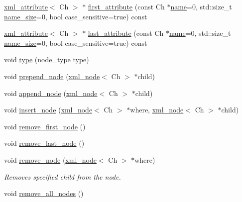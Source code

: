\begin{DoxyCompactItemize}
\item 
\hyperlink{classrapidxml_1_1xml__attribute}{xml\-\_\-attribute}$<$ Ch $>$ $\ast$ \hyperlink{classrapidxml_1_1xml__node_ae426802be58114ffc41bf30ac6b8c37d}{first\-\_\-attribute} (const Ch $\ast$\hyperlink{classrapidxml_1_1xml__base_a9a09739310469995db078ebd0da3ed45}{name}=0, std\-::size\-\_\-t \hyperlink{classrapidxml_1_1xml__base_a7e7f98b3d01e1eab8dc1ca69aad9af84}{name\-\_\-size}=0, bool case\-\_\-sensitive=true) const 
\item 
\hyperlink{classrapidxml_1_1xml__attribute}{xml\-\_\-attribute}$<$ Ch $>$ $\ast$ \hyperlink{classrapidxml_1_1xml__node_a50c03f2db3fa51f27a73d86ec29a49d3}{last\-\_\-attribute} (const Ch $\ast$\hyperlink{classrapidxml_1_1xml__base_a9a09739310469995db078ebd0da3ed45}{name}=0, std\-::size\-\_\-t \hyperlink{classrapidxml_1_1xml__base_a7e7f98b3d01e1eab8dc1ca69aad9af84}{name\-\_\-size}=0, bool case\-\_\-sensitive=true) const 
\item 
void \hyperlink{classrapidxml_1_1xml__node_a499bbc9300c1b06821d5c08b24164c68}{type} (node\-\_\-type type)
\item 
void \hyperlink{classrapidxml_1_1xml__node_ae86e92908c3eab40bbed8216e4f3f3cb}{prepend\-\_\-node} (\hyperlink{classrapidxml_1_1xml__node}{xml\-\_\-node}$<$ Ch $>$ $\ast$child)
\item 
void \hyperlink{classrapidxml_1_1xml__node_a8696d098ecc9c4d2a646b43e91d58e31}{append\-\_\-node} (\hyperlink{classrapidxml_1_1xml__node}{xml\-\_\-node}$<$ Ch $>$ $\ast$child)
\item 
void \hyperlink{classrapidxml_1_1xml__node_a666880f42a7e486d78cc45ed51c7c46d}{insert\-\_\-node} (\hyperlink{classrapidxml_1_1xml__node}{xml\-\_\-node}$<$ Ch $>$ $\ast$where, \hyperlink{classrapidxml_1_1xml__node}{xml\-\_\-node}$<$ Ch $>$ $\ast$child)
\item 
void \hyperlink{classrapidxml_1_1xml__node_a62bf7b276cf7a651a3337f5e0a0ef6ac}{remove\-\_\-first\-\_\-node} ()
\item 
void \hyperlink{classrapidxml_1_1xml__node_a9182512e948ec451a83f116cce7c7674}{remove\-\_\-last\-\_\-node} ()
\item 
\hypertarget{classrapidxml_1_1xml__node_a98289923eb9e8889418a9eb0207ea35c}{void \hyperlink{classrapidxml_1_1xml__node_a98289923eb9e8889418a9eb0207ea35c}{remove\-\_\-node} (\hyperlink{classrapidxml_1_1xml__node}{xml\-\_\-node}$<$ Ch $>$ $\ast$where)}\label{classrapidxml_1_1xml__node_a98289923eb9e8889418a9eb0207ea35c}

\begin{DoxyCompactList}\small\item\em Removes specified child from the node. \end{DoxyCompactList}\item 
\hypertarget{classrapidxml_1_1xml__node_a95735358b079ae0adcfbbac69aa1fbc3}{void \hyperlink{classrapidxml_1_1xml__node_a95735358b079ae0adcfbbac69aa1fbc3}{remove\-\_\-all\-\_\-nodes} ()}\label{classrapidxml_1_1xml__node_a95735358b079ae0adcfbbac69aa1fbc3}


\end{DoxyCompactItemize}
